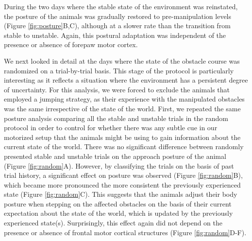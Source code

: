 During the two days where the stable state of the environment was reinstated, the posture of the animals was gradually restored to pre-manipulation levels (Figure \ref{fig:posture}B,C), although at a slower rate than the transition from stable to unstable. Again, this postural adaptation was independent of the presence or absence of forepaw motor cortex.

We next looked in detail at the days where the state of the obstacle course was randomized on a trial-by-trial basis. This stage of the protocol is particularly interesting as it reflects a situation where the environment has a persistent degree of uncertainty. For this analysis, we were forced to exclude the animals that employed a jumping strategy, as their experience with the manipulated obstacles was the same irrespective of the state of the world. First, we repeated the same posture analysis comparing all the stable and unstable trials in the random protocol in order to control for whether there was any subtle cue in our motorized setup that the animals might be using to gain information about the current state of the world. There was no significant difference between randomly presented stable and unstable trials on the approach posture of the animal (Figure \ref{fig:random}A). However, by classifying the trials on the basis of past trial history, a significant effect on posture was observed (Figure \ref{fig:random}B), which became more pronounced the more consistent the previously experienced state (Figure \ref{fig:random}C). This suggests that the animals adjust their body posture when stepping on the affected obstacles on the basis of their current expectation about the state of the world, which is updated by the previously experienced state(s). Surprisingly, this effect again did not depend on the presence or absence of frontal motor cortical structures (Figure \ref{fig:random}D-F).

